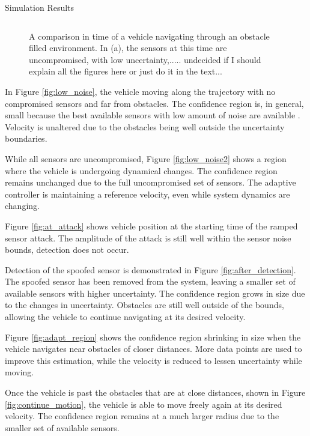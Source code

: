 \begin{section}{Simulation Results}
\begin{figure}[b!th]
\begin{tabular}{ccc}
\end{tabular}
\caption{A comparison in time of a vehicle navigating through an obstacle filled environment. In (a), the sensors at this time are uncompromised, with low uncertainty,..... undecided if I should explain all the figures here or just do it in the text... }

\end{figure}

In Figure \ref{fig:low_noise}, the vehicle moving along the trajectory with no compromised sensors and far from obstacles. The confidence region is, in general, small because the best available sensors with low amount of noise are available . Velocity is unaltered due to the obstacles being well outside the uncertainty boundaries.

While all sensors are uncompromised, Figure \ref{fig:low_noise2} shows a region where the vehicle is undergoing dynamical changes. The confidence region remains unchanged due to the full uncompromised set of sensors. The adaptive controller is maintaining a reference velocity, even while system dynamics are changing.

Figure \ref{fig:at_attack} shows vehicle position at the starting time of the ramped sensor attack. The amplitude of the attack is still well within the sensor noise bounds, detection does not occur.


Detection of the spoofed sensor is demonstrated in Figure \ref{fig:after_detection}. The spoofed sensor has been removed from the system, leaving a smaller set of available sensors with higher uncertainty. The confidence region grows in size due to the changes in uncertainty. Obstacles are still well outside of the bounds, allowing the vehicle to continue navigating at its desired velocity.

Figure \ref{fig:adapt_region} shows the confidence region shrinking in size when the vehicle navigates near obstacles of closer distances. More data points are used to improve this estimation, while the velocity is reduced to lessen uncertainty while moving.

Once the vehicle is past the obstacles that are at close distances, shown in Figure \ref{fig:continue_motion}, the vehicle is able to move freely again at its desired velocity. The confidence region remains at a much larger radius due to the smaller set of available sensors.



\begin{figure}
\vspace{1pt}
\centering
\begin{tabular}{cc}


\end{tabular}
\end{figure}
\end{section}
